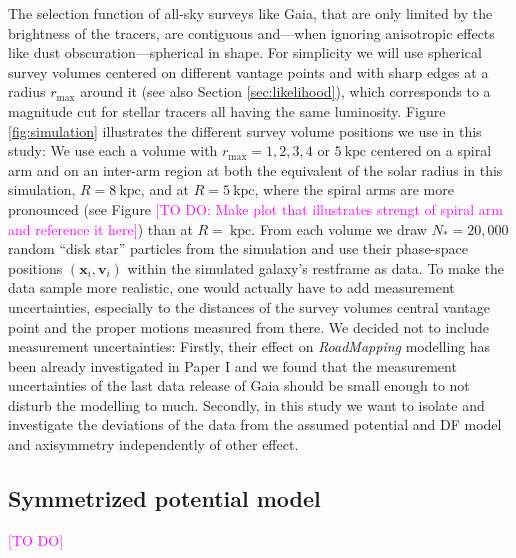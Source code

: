 \documentclass[iop,revtex4,numberedappendix,appendixfloats]{emulateapj}
\newcommand{\vect}[1]{\boldsymbol{#1}}
\newcommand{\RM}{{\sl RoadMapping}}
\newcommand{\Wilma}[1]{\textcolor{Magenta}{#1}}
\begin{document}
The selection function of all-sky surveys like Gaia, that are only limited by the brightness of the tracers, are contiguous and---when ignoring anisotropic effects like dust obscuration---spherical in shape. For simplicity we will use spherical survey volumes centered on different vantage points and with sharp edges at a radius $r_\text{max}$ around it (see also Section \ref{sec:likelihood}), which corresponds to a magnitude cut for stellar tracers all having the same luminosity. Figure \ref{fig:simulation} illustrates the different survey volume positions we use in this study: We use each a volume with $r_\text{max}=1,2,3,4$ or $5~\text{kpc}$ centered on a spiral arm and on an inter-arm region at both the equivalent of the solar radius in this simulation, $R=8~\text{kpc}$, and at $R=5~\text{kpc}$, where the spiral arms are more pronounced (see Figure \Wilma{[TO DO: Make plot that illustrates strengt of spiral arm and reference it here]}) than at $R=~\text{kpc}$. From each volume we draw $N_*=20,000$ random ``disk star'' particles from the simulation and use their phase-space positions $(\vect{x}_i,\vect{v}_i)$ within the simulated galaxy's restframe as data. To make the data sample more realistic, one would actually have to add measurement uncertainties, especially to the distances of the survey volumes central vantage point and the proper motions measured from there. We decided not to include measurement uncertainties: Firstly, their effect on \RM{} modelling has been already investigated in Paper I and we found that the measurement uncertainties of the last data release of Gaia should be small enough to not disturb the modelling to much. Secondly, in this study we want to isolate and investigate the deviations of the data from the assumed potential and DF model and axisymmetry independently of other effect.

\subsection{Symmetrized potential model}

\Wilma{[TO DO]}
\end{document}
